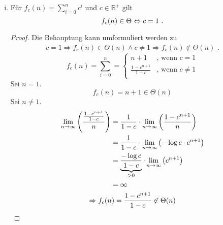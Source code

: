 \documentclass[a4paper]{scrartcl}
\begin{document}
\begin{enumerate}
\begin{enumerate}[(i)]
                \item
                    \begin{behaupt}
                        Für $f_c(n) = \sum_{i=0}^n c^i$ und $c \in \mathbb{R}^+$ gilt
                        \begin{equation}
                            f_c(n) \in \Theta \Leftrightarrow c = 1 \text{ .}
                        \end{equation}
                    \end{behaupt}
                    \begin{proof}
                        Die Behauptung kann umformuliert werden zu
                        \begin{gather}
                            c = 1 \Rightarrow f_c(n) \in \Theta(n)
                            \land
                            c \neq 1 \Rightarrow f_c(n) \not\in \Theta(n)
                            \text{ .}
                        \end{gather}
                        \begin{equation}
                            f_c(n) = \sum_{i=0}^{n}
                            =
                            \begin{cases}
                                n + 1 & \text{, wenn } c = 1 \\
                                \frac{1-c^{n+1}}{1-c} & \text{, wenn } c \neq 1 \\
                            \end{cases}
                        \end{equation}
                        Sei $n = 1$.
                        \begin{equation}
                            f_c(n) = n + 1 \in \Theta(n)
                        \end{equation}
                        Sei $n \neq 1$.
                        \begin{equation}
                            \begin{gathered}
                                \begin{split}
                                \lim_{n \to \infty} \left( \frac{\frac{1 - c^{n+1}}{1 - c}}{n} \right)
                                &= \frac{1}{1-c} \cdot \lim_{n \to \infty} \left( \frac{1-c^{n+1}}{n} \right) \\
                                &= \frac{1}{1-c} \cdot \lim_{n \to \infty} \left( -\log c \cdot c^{n+1} \right) \\
                                &= \underbrace{\frac{-\log c}{1-c}}_{> 0} \cdot \lim_{n \to \infty} \left( c^{n+1} \right) \\
                                &= \infty
                                \end{split} \\
                                \Rightarrow f_c(n) = \frac{1 - c^{n+1}}{1 - c} \not\in\Theta(n)
                            \end{gathered}
                        \end{equation}
                        

\end{proof}
\end{enumerate}
\end{enumerate}
\end{document}
